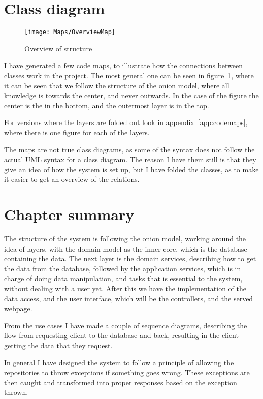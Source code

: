 \section{Class diagram}
\label{sec:class_diagram}
\begin{figure}[h]
  \centering
  \texttt{[image: Maps/OverviewMap]}
  \caption{Overview of structure}
  \label{fig:overviewMap}
\end{figure}

I have generated a few code maps, to illustrate how the connections between
classes work in the project. The most general one can be seen in
figure~\ref{fig:overviewMap}, where it can be seen that we follow the structure
of the onion model, where all knowledge is towards the center, and never
outwards. In the case of the figure the center is the in the bottom, and the
outermost layer is in the top.

For versions where the layers are folded out look in
appendix~\ref{app:codemaps}, where there is one figure for each of the layers.

The maps are not true class diagrams, as some of the syntax does not follow the
actual UML syntax for a class diagram. The reason I have them still is that they
give an idea of how the system is set up, but I have folded the classes, as to
make it easier to get an overview of the relations.

\section{Chapter summary}
The structure of the system is following the onion model, working around the
idea of layers, with the domain model as the inner core, which is the database
containing the data. The next layer is the domain services, describing how to
get the data from the database, followed by the application services, which is
in charge of doing data manipulation, and tasks that is essential to the system,
without dealing with a user yet. After this we have the implementation of the
data access, and the user interface, which will be the controllers, and the
served webpage.

From the use cases I have made a couple of sequence diagrams, describing the flow
from requesting client to the database and back, resulting in the client
getting the data that they request. 

In general I have designed the system to follow a principle of allowing the
repositories to throw exceptions if something goes wrong. These exceptions are
then caught and transformed into proper responses based on the exception thrown.

